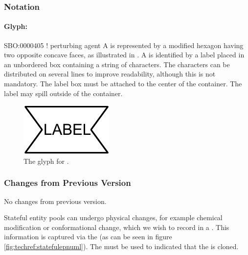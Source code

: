 \subsubsection{Notation}

\paragraph{Glyph: }

\begin{glyphDescription}
\glyphSboTerm SBO:0000405 ! perturbing agent
\glyphContainer A  is represented by a modified hexagon
having two opposite concave faces, as illustrated in .
\glyphLabel A  is identified by a label placed in an
unbordered box containing a string of characters.  The characters can be
distributed on several lines to improve readability, although this is not
mandatory.  The label box must be attached to the center of the
 container.  The label may spill outside of the container.
\end{glyphDescription}

\begin{figure}[htb]
  \centering
  \includegraphics[scale = 0.3]{images/perturbing_agent}
  \caption{The \PD glyph for .}
  \label{fig:techref:perturbing agent}
\end{figure}

\subsubsection{Changes from Previous Version}

No changes from previous version.

\label{defn:StatefulEPN}

Stateful entity pools can undergo physical changes, for example
chemical modification or conformational change, which we wish to record
in a \PDm. This information is captured via the
 (as can be seen in figure
\ref{fig:techref:statefulepnuml}). The  must be
used to indicated that the  is cloned.

